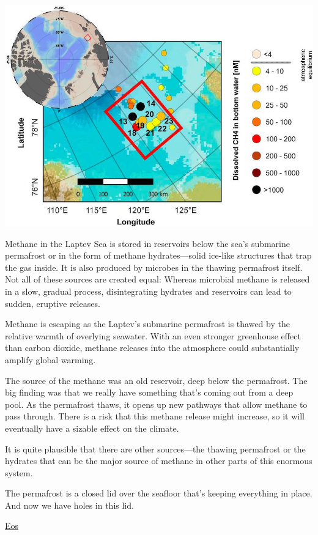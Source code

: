\documentclass[
]{book}
\begin{document}
\includegraphics{fig/laptev-sea-methane-map.jpg}

Methane in the Laptev Sea is stored in reservoirs below the sea's submarine permafrost or in the form of methane hydrates---solid ice-like structures that trap the gas inside. It is also produced by microbes in the thawing permafrost itself. Not all of these sources are created equal: Whereas microbial methane is released in a slow, gradual process, disintegrating hydrates and reservoirs can lead to sudden, eruptive releases.

Methane is escaping as the Laptev's submarine permafrost is thawed by the relative warmth of overlying seawater. With an even stronger greenhouse effect than carbon dioxide, methane releases into the atmosphere could substantially amplify global warming.

The source of the methane was an old reservoir, deep below the permafrost.
The big finding was that we really have something that's coming out from a deep pool.
As the permafrost thaws, it opens up new pathways that allow methane to pass through.
There is a risk that this methane release might increase, so it will eventually have a sizable effect on the climate.

It is quite plausible that there are other sources---the thawing permafrost or the hydrates that can be the major source of methane in other parts of this enormous system.

The permafrost is a closed lid over the seafloor that's keeping everything in place. And now we have holes in this lid.

\href{https://eos.org/articles/a-massive-methane-reservoir-is-lurking-beneath-the-sea\#.YJUr2-3rTRI.twitter}{Eos}
\end{document}
